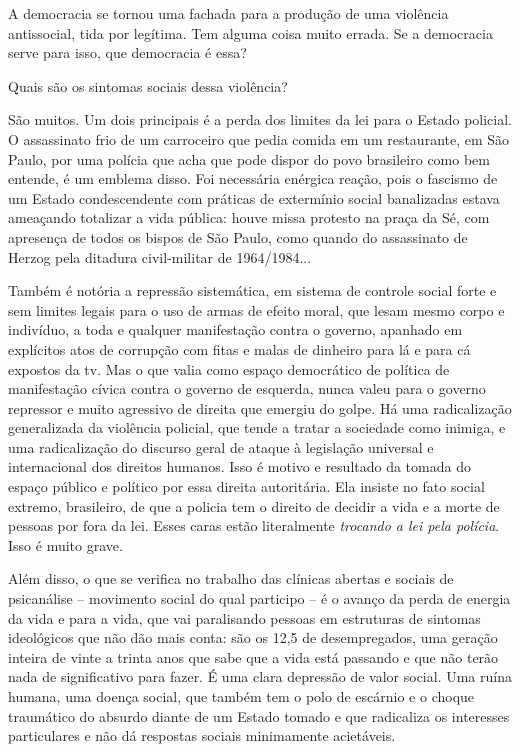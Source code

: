 A democracia se tornou uma fachada para a produção de uma violência
antissocial, tida por legítima. Tem alguma coisa muito errada. Se a
democracia serve para isso, que democracia é essa?

Quais são os sintomas sociais dessa violência?

São muitos. Um dois principais é a perda dos limites da lei para o
Estado policial. O assassinato frio de um carroceiro que pedia comida em
um restaurante, em São Paulo, por uma polícia que acha que pode dispor
do povo brasileiro como bem entende, é um emblema disso. Foi necessária
enérgica reação, pois o fascismo de um Estado condescendente com
práticas de extermínio social banalizadas estava ameaçando totalizar a
vida pública: houve missa protesto na praça da Sé, com apresença de
todos os bispos de São Paulo, como quando do assassinato de Herzog pela
ditadura civil-militar de 1964/1984...

Também é notória a repressão sistemática, em sistema de controle social
forte e sem limites legais para o uso de armas de efeito moral, que
lesam mesmo corpo e indivíduo, a toda e qualquer manifestação contra o
governo, apanhado em explícitos atos de corrupção com fitas e malas de
dinheiro para lá e para cá expostos da tv. Mas o que valia como espaço
democrático de política de manifestação cívica contra o governo de
esquerda, nunca valeu para o governo repressor e muito agressivo de
direita que emergiu do golpe. Há uma radicalização generalizada da
violência policial, que tende a tratar a sociedade como inimiga, e uma
radicalização do discurso geral de ataque à legislação universal e
internacional dos direitos humanos. Isso é motivo e resultado da tomada
do espaço público e político por essa direita autoritária. Ela insiste
no fato social extremo, brasileiro, de que a policia tem o direito de
decidir a vida e a morte de pessoas por fora da lei. Esses caras estão
literalmente \emph{trocando a lei pela polícia}. Isso é muito grave.

Além disso, o que se verifica no trabalho das clínicas abertas e sociais
de psicanálise -- movimento social do qual participo -- é o avanço da
perda de energia da vida e para a vida, que vai paralisando pessoas em
estruturas de sintomas ideológicos que não dão mais conta: são os 12,5
de desempregados, uma geração inteira de vinte a trinta anos que sabe
que a vida está passando e que não terão nada de significativo para
fazer. É uma clara depressão de valor social. Uma ruína humana, uma
doença social, que também tem o polo de escárnio e o choque traumático
do absurdo diante de um Estado tomado e que radicaliza os interesses
particulares e não dá respostas sociais minimamente acietáveis.

